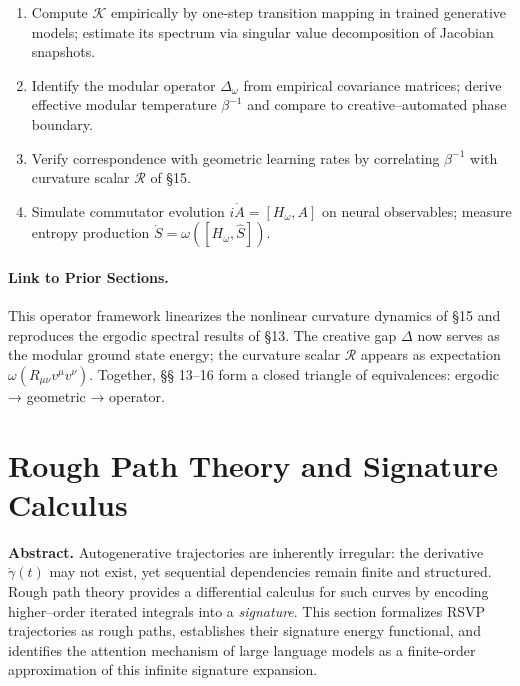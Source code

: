 \documentclass[12pt,a4paper,twoside,openright]{book}
\begin{document}
\begin{enumerate}
\item Compute $\mathcal{K}$ empirically by one-step transition mapping in trained generative models;  
estimate its spectrum via singular value decomposition of Jacobian snapshots.
\item Identify the modular operator $\Delta_\omega$ from empirical covariance matrices;  
derive effective modular temperature $\beta^{-1}$ and compare to creative–automated phase boundary.
\item Verify correspondence with geometric learning rates by correlating $\beta^{-1}$ with curvature scalar $\mathcal{R}$ of §15.
\item Simulate commutator evolution $i\dot A=[H_\omega,A]$ on neural observables;  
measure entropy production $\dot S=\omega([H_\omega,\widehat{S}])$.
\end{enumerate}

\paragraph{Link to Prior Sections.}
This operator framework linearizes the nonlinear curvature dynamics of §15 and reproduces the ergodic spectral results of §13.  
The creative gap $\Delta$ now serves as the modular ground state energy;  
the curvature scalar $\mathcal{R}$ appears as expectation $\omega(R_{\mu\nu}v^\mu v^\nu)$.  
Together, §§ 13–16 form a closed triangle of equivalences:  
ergodic → geometric → operator.



\section{Rough Path Theory and Signature Calculus}
\label{sec:roughpath}

\textbf{Abstract.}
Autogenerative trajectories are inherently irregular: the derivative $\dot\gamma(t)$ may not exist, yet sequential dependencies remain finite and structured.  
Rough path theory provides a differential calculus for such curves by encoding higher–order iterated integrals into a \emph{signature}.  
This section formalizes RSVP trajectories as rough paths, establishes their signature energy functional, and identifies the attention mechanism of large language models as a finite-order approximation of this infinite signature expansion.
\end{document}
